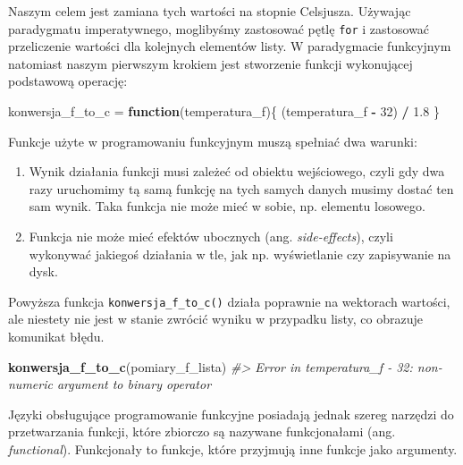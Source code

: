 \documentclass[paper=6in:9in,pagesize=pdftex,headinclude=on,footinclude=on,10pt]{scrbook}
\newenvironment{Shaded}{\begin{snugshade}}{\end{snugshade}}
\newcommand{\CommentTok}[1]{\textcolor[rgb]{0.56,0.35,0.01}{\textit{#1}}}
\newcommand{\ControlFlowTok}[1]{\textcolor[rgb]{0.13,0.29,0.53}{\textbf{#1}}}
\newcommand{\DecValTok}[1]{\textcolor[rgb]{0.00,0.00,0.81}{#1}}
\newcommand{\FloatTok}[1]{\textcolor[rgb]{0.00,0.00,0.81}{#1}}
\newcommand{\KeywordTok}[1]{\textcolor[rgb]{0.13,0.29,0.53}{\textbf{#1}}}
\newcommand{\NormalTok}[1]{#1}
\newcommand{\OperatorTok}[1]{\textcolor[rgb]{0.81,0.36,0.00}{\textbf{#1}}}
\newcommand{\StringTok}[1]{\textcolor[rgb]{0.31,0.60,0.02}{#1}}
\providecommand{\tightlist}{%
  \setlength{\itemsep}{0pt}\setlength{\parskip}{0pt}}
\let\BeginKnitrBlock\begin \let\EndKnitrBlock\end
\begin{document}
Naszym celem jest zamiana tych wartości na stopnie Celsjusza.
Używając paradygmatu imperatywnego, moglibyśmy zastosować pętlę \texttt{for} i zastosować przeliczenie wartości dla kolejnych elementów listy.
W paradygmacie funkcyjnym natomiast naszym pierwszym krokiem jest stworzenie funkcji wykonującej podstawową operację:

\begin{Shaded}
\begin{Highlighting}[]
\NormalTok{konwersja_f_to_c =}\StringTok{ }\ControlFlowTok{function}\NormalTok{(temperatura_f)\{}
\NormalTok{    (temperatura_f }\OperatorTok{-}\StringTok{ }\DecValTok{32}\NormalTok{) }\OperatorTok{/}\StringTok{ }\FloatTok{1.8}
\NormalTok{\}}
\end{Highlighting}
\end{Shaded}

\BeginKnitrBlock{rmdinfo}
Funkcje użyte w programowaniu funkcyjnym muszą spełniać dwa warunki:

\begin{enumerate}
\def\labelenumi{\arabic{enumi}.}
\tightlist
\item
  Wynik działania funkcji musi zależeć od obiektu wejściowego, czyli gdy dwa razy uruchomimy tą samą funkcję na tych samych danych musimy dostać ten sam wynik.
  Taka funkcja nie może mieć w sobie, np. elementu losowego.
\item
  Funkcja nie może mieć efektów ubocznych (ang. \emph{side-effects}), czyli wykonywać jakiegoś działania w tle, jak np. wyświetlanie czy zapisywanie na dysk.
\end{enumerate}
\EndKnitrBlock{rmdinfo}

Powyższa funkcja \texttt{konwersja\_f\_to\_c()} działa poprawnie na wektorach wartości, ale niestety nie jest w stanie zwrócić wyniku w przypadku listy, co obrazuje komunikat błędu.

\begin{Shaded}
\begin{Highlighting}[]
\KeywordTok{konwersja_f_to_c}\NormalTok{(pomiary_f_lista)}
\CommentTok{#> Error in temperatura_f - 32: non-numeric argument to binary operator}
\end{Highlighting}
\end{Shaded}

Języki obsługujące programowanie funkcyjne posiadają jednak szereg narzędzi do przetwarzania funkcji, które zbiorczo są nazywane funkcjonałami (ang. \emph{functional}).
Funkcjonały to funkcje, które przyjmują inne funkcje jako argumenty.
\end{document}
